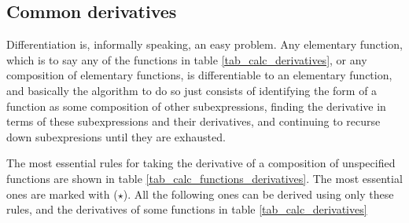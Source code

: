 \documentclass[fleqn,a4paper,11pt]{article}
\begin{document}
    \subsection{Common derivatives} \label{calc_common}


    Differentiation is, informally speaking, an easy problem. Any elementary
    function, which is to say any of the functions in table
    \ref{tab_calc_derivatives}, or any composition of elementary functions, is
    differentiable to an elementary function, and basically the algorithm to do
    so just consists of identifying the form of a function as some composition
    of other subexpressions, finding the derivative in terms of these
    subexpressions and their derivatives, and continuing to recurse down
    subexpresions until they are exhausted.

    The most essential rules for taking the derivative of a composition of
    unspecified functions are shown in table
    \ref{tab_calc_functions_derivatives}. The most essential ones are marked
    with (\(\star\)). All the following ones can be derived using only these
    rules, and the derivatives of some functions in table
    \ref{tab_calc_derivatives}
\end{document}
